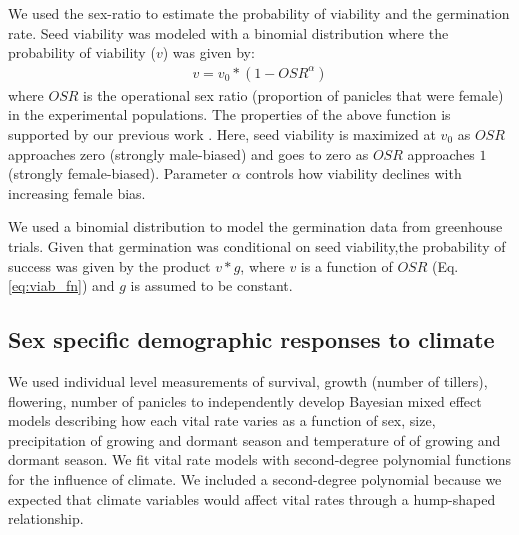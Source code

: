 \documentclass[11pt]{article}\usepackage[]{graphicx}\usepackage[usenames,dvipsnames]{xcolor}
\begin{document}
We used the sex-ratio to estimate the probability of viability and the germination rate. 
Seed viability was modeled with a binomial distribution where the probability of viability ($v$) was given by:
\begin{align}\label{eq:viab_fn}
v = v_{0} * (1 - OSR^{\alpha})
\end{align}
\noindent where $OSR$ is the operational sex ratio (proportion of panicles that were female) in the experimental populations.
The properties of the above function is supported by our previous work \citep{compagnoni2017can}. 
Here, seed viability is maximized at $v_{0}$ as $OSR$ approaches zero (strongly male-biased) and goes to zero as $OSR$ approaches $1$ (strongly female-biased).
Parameter $\alpha$ controls how viability declines with increasing female bias.

We used a binomial distribution to model the germination data from greenhouse trials.
Given that germination was conditional on seed viability,the probability of success was given by the product $v*g$, where $v$ is a function of $OSR$ (Eq. \ref{eq:viab_fn}) and $g$ is assumed to be constant.

\subsection*{Sex specific demographic responses to climate}
We used individual level measurements of survival, growth (number of tillers), flowering, number of panicles to independently develop Bayesian mixed effect models describing how each vital rate varies as a function of sex, size, precipitation of growing and dormant season and temperature of of growing and dormant season. 
We fit vital rate models with second-degree polynomial functions for the influence of climate.
We included a second-degree polynomial because we expected that climate variables would affect vital rates through a hump-shaped relationship. 
\end{document}

